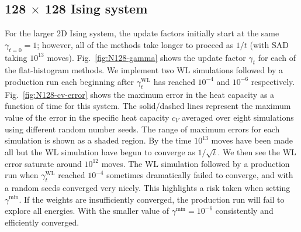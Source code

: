 \subsection{128 $\times$ 128 Ising system}
For the larger 2D Ising system, the update factors initially
start at the same $\gamma_{t=0} = 1$; however, all of the methods take longer
to proceed as $1/t$ (with SAD taking $10^{13}$ moves). Fig.~\ref{fig:N128-gamma} shows the update factor $\gamma_t$ for each of the 
flat-histogram methods. 
We implement two WL simulations followed by a production run each beginning
after $\gamma^{\text{WL}}_t$ has reached $10^{-4}$ and $10^{-6}$ respectively.
Fig.~\ref{fig:N128-cv-error} shows the maximum error in the heat capacity as a 
function of time for this system. The solid/dashed lines represent the maximum
value of the error in the specific heat capacity $c_V$ averaged
over eight simulations using different random number seeds. The range of maximum
errors for each simulation is shown as a shaded region. By
the time $10^{13}$ moves have been made all but the WL simulation have begun to
converge as $1/\sqrt{t}$. We then see the WL error saturate around $10^{12}$
moves.  The WL simulation followed by a production run when
$\gamma^{\text{WL}}_t$ reached $10^{-4}$ sometimes dramatically failed to
converge, and with a  random seeds converged very
nicely.  This highlights a risk taken when setting $\gamma^{\min}$.
If the weights are insufficiently converged, the production run will
fail to explore all energies.   With the smaller value of
$\gamma^{\min}=10^{-6}$ consistently and efficiently converged.


